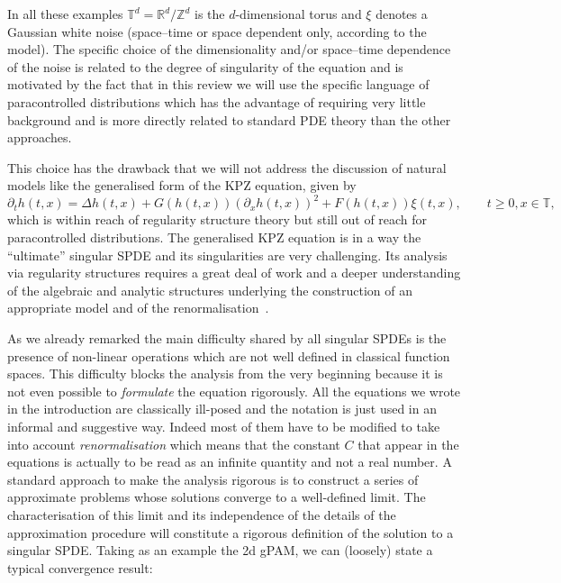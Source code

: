 \documentclass[a4paper, 11pt]{article}
\newcommand{\tmtextit}[1]{{\itshape{#1}}}
\begin{document}
In all these examples $\mathbb{T}^d =\mathbb{R}^d /\mathbb{Z}^d$ is the
$d$-dimensional torus and $\xi$ denotes a Gaussian white noise (space--time or
space dependent only, according to the model). The specific choice of the
dimensionality and/or space--time dependence of the noise is related to the
degree of singularity of the equation and is motivated by the fact that in
this review we will use the specific language of paracontrolled distributions
which has the advantage of requiring very little background and is more
directly related to standard PDE theory than the other approaches.

This choice has the drawback that we will not address the discussion of
natural models like the generalised form of the KPZ equation, given by
\[ \partial_t h (t, x) = \Delta h (t, x) + G (h (t, x)) (\partial_x h (t,
   x))^2 + F (h (t, x)) \xi (t, x), \qquad t \geqslant 0, x \in \mathbb{T},
\]
which is within reach of regularity structure theory but still out of reach
for paracontrolled distributions. The generalised KPZ equation is in a way the
``ultimate'' singular SPDE and its singularities are very challenging. Its
analysis via regularity structures requires a great deal of work and a deeper
understanding of the algebraic and analytic structures underlying the
construction of an appropriate model and of the
renormalisation~{\cite{bruned_algebraic_2016,chandra_analytic_2016}}. 

As we already remarked the main difficulty shared by all singular SPDEs is the
presence of non-linear operations which are not well defined in classical
function spaces. This difficulty blocks the analysis from the very beginning
because it is not even possible to \tmtextit{formulate} the equation
rigorously. All the equations we wrote in the introduction are classically
ill-posed and the notation is just used in an informal and suggestive way.
Indeed most of them have to be modified to take into account
\tmtextit{renormalisation} which means that the constant $C$ that appear in
the equations is actually to be read as an infinite quantity and not a real
number. A standard approach to make the analysis rigorous is to construct a
series of approximate problems whose solutions converge to a well-defined
limit. The characterisation of this limit and its independence of the details
of the approximation procedure will constitute a rigorous definition of the
solution to a singular SPDE. Taking as an example the 2d gPAM, we can
(loosely) state a typical convergence result:
\end{document}
